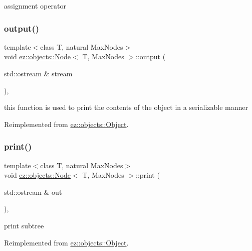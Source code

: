 assignment operator \mbox{\label{classez_1_1objects_1_1Node_accf427aa06dc326baa7a12497cae6045}} 
\subsubsection{\texorpdfstring{output()}{output()}}
{\footnotesize\ttfamily template$<$class T, natural Max\+Nodes$>$ \\
void \hyperlink{classez_1_1objects_1_1Node}{ez\+::objects\+::\+Node}$<$ T, Max\+Nodes $>$\+::output (\begin{DoxyParamCaption}\item[{std\+::ostream \&}]{stream }\end{DoxyParamCaption})\hspace{0.3cm}{\ttfamily [inline]}, {\ttfamily [virtual]}}

this function is used to print the contents of the object in a serializable manner 

Reimplemented from \hyperlink{classez_1_1objects_1_1Object_a0fdfe18e6c35d6b0d7e7a01265aded15}{ez\+::objects\+::\+Object}.

\mbox{\label{classez_1_1objects_1_1Node_a56c80924a071a04d3fbb55c536efe293}} 
\subsubsection{\texorpdfstring{print()}{print()}}
{\footnotesize\ttfamily template$<$class T, natural Max\+Nodes$>$ \\
void \hyperlink{classez_1_1objects_1_1Node}{ez\+::objects\+::\+Node}$<$ T, Max\+Nodes $>$\+::print (\begin{DoxyParamCaption}\item[{std\+::ostream \&}]{out }\end{DoxyParamCaption})\hspace{0.3cm}{\ttfamily [inline]}, {\ttfamily [virtual]}}

print subtree 

Reimplemented from \hyperlink{classez_1_1objects_1_1Object_a9e20f39a78163f67f000576149d858b3}{ez\+::objects\+::\+Object}.

